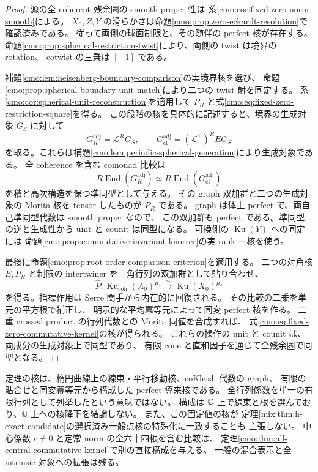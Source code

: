 \begin{proof}
源の全 coherent 残余圏の smooth proper 性は
系\ref{cmo:cor:fixed-zero-norm-smooth}による。
$X_0,Z,Y$ の滑らかさは命題\ref{cmo:prop:zero-eckardt-resolution}で確認済みである。
従って両側の球面制限と、その随伴の perfect 核が存在する。
命題\ref{cmo:prop:spherical-restriction-twist}により、両側の twist は境界の rotation、
cotwist の三乗は $[-1]$ である。

補題\ref{cmo:lem:heisenberg-boundary-comparison}の実境界核を選び、
命題\ref{cmo:prop:spherical-boundary-unit-match}により二つの twist 射を同定する。
系\ref{cmo:cor:spherical-unit-reconstruction}を適用して
$P_R$ と式\eqref{cmo:eq:fixed-zero-restriction-square}を得る。
この段階の核を具体的に記述すると、境界の生成対象 $G_S$ に対して
\[
 G_R^{\mathrm{adj}}=\mathcal L^RG_S,\qquad
 G_{\mathrm{cl}}^{\mathrm{adj}}
      =(\mathcal L^{\mathrm{cl}})^R E G_S
\]
を取る。これらは補題\ref{cmo:lem:periodic-spherical-generation}により生成対象である。
全 coherence を含む comonad 比較は
\[
 R\operatorname{End}(G_R^{\mathrm{adj}})
       \simeq R\operatorname{End}(G_{\mathrm{cl}}^{\mathrm{adj}})
\]
を積と高次構造を保つ準同型として与える。
その graph 双加群と二つの生成対象の Morita 核を tensor したものが $P_R$ である。
graph は体上 perfect で、両自己準同型代数は smooth proper なので、
この双加群も perfect である。準同型の逆と生成性から unit と counit は同型になる。
可換側の $\operatorname{Ku}(Y)$ への同定には
命題\ref{cmo:prop:commutative-invariant-knorrer}の実 rank 一核を使う。

最後に命題\ref{cmo:prop:root-order-comparison-criterion}を適用する。
二つの対角核 $E,P_R$ と制限の intertwiner を三角行列の双加群として貼り合わせ、
\[
 \widehat P:\operatorname{Ku}_{\mathrm{coh}}(A_0)^{\mu_2}
       \xrightarrow{\sim}\operatorname{Ku}(X_0)^{\mu_2}
\]
を得る。指標作用は Serre 関手から内在的に回復される。
その比較の二乗を単元の平方根で補正し、
明示的な平均冪等元によって同変 perfect 核を作る。
二重 crossed product の行列代数との Morita 同値を合成すれば、
式\eqref{cmo:eq:fixed-zero-commutative-kernel}の核が得られる。
これらの操作の unit と counit は、両成分の生成対象上で同型であり、
有限 cone と直和因子を通じて全残余圏で同型となる。
\end{proof}

\begin{remark}[構成の範囲]
\label{cmo:rem:fixed-zero-kernel-scope}
定理の核は、楕円曲線上の線束・平行移動核、coKleisli 代数の graph、
有限の貼合せと同変冪等元から構成した perfect 導来核である。
全行列係数を単一の有限行列として列挙したという意味ではない。
構成は $\mathbb C$ 上で線束と根を選んでおり、$\mathbb Q$ 上への核降下を結論しない。
また、この固定値の核が
定理\ref{mix:thm:h-exact-candidate}の選択済み一般点核の特殊化に一致することも
主張しない。
中心係数 $c\ne0$ と定常 norm の全六十四根を含む比較は、
定理\ref{cmo:thm:all-central-commutative-kernel}で別の直接構成を与える。
一般の混合表示と全 intrinsic 対象への拡張は残る。
\end{remark}
